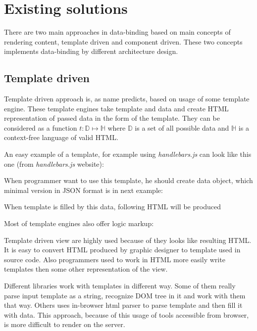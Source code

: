 \chapter{Existing solutions}\label{chap:existing}

There are two main approaches in data-binding based on main concepts of rendering content, template driven and component driven.
These two concepts implements data-binding by different architecture design. 

\section{Template driven}\label{sec:existing-template}

	Template driven approach is, as name predicts, based on usage of some template engine. 
	These template engines take template and data and create HTML representation of passed data in the form of the template. 
	They can be considered as a function $t:\mathbb D\mapsto\mathbb H$ where $\mathbb D$ is a set of all possible data and $\mathbb H$ is a context-free language of valid HTML.

	An easy example of a template, for example using \textit{handlebars.js} can look like this one (from \textit{handlebars.js} website):
  

	When programmer want to use this template, he should create data object, which minimal version in JSON format is in next example:
  

	When template is filled by this data, following HTML will be produced
  

	Most of template engines also offer logic markup:
  

	Template driven view are highly used because of they looks like resulting HTML. 
	It is easy to convert HTML produced by graphic designer to template used in source code. 
	Also programmers used to work in HTML more easily write templates then some other representation of the view.

	Different libraries work with templates in different way. 
	Some of them really parse input template as a string, recognize DOM tree in it and work with them that way.
	Others uses in-browser html parser to parse template and then fill it with data.
	This approach, because of this usage of tools accessible from browser, is more difficult to render on the server.

